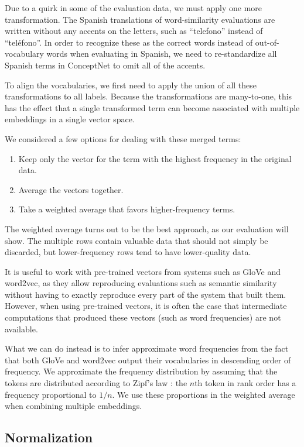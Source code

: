 \documentclass[11pt,letterpaper]{article}
\begin{document}
Due to a quirk in some of the evaluation data, we must apply one more
transformation. The Spanish translations of word-similarity evaluations
\cite{hassan2009crosslingual} are written without any accents on the letters,
such as ``telefono'' instead of ``tel\'{e}fono''. In order to recognize these as
the correct words instead of out-of-vocabulary words when evaluating in Spanish,
we need to re-standardize all Spanish terms in ConceptNet to omit all of the
accents.

To align the vocabularies, we first need to apply the union of all these
transformations to all labels. Because the transformations are many-to-one, this
has the effect that a single transformed term can become associated with
multiple embeddings in a single vector space.

We considered a few options for dealing with these merged terms:

\begin{enumerate}
\item Keep only the vector for the term with the highest frequency in the
    original data.
\item Average the vectors together.
\item Take a weighted average that favors higher-frequency terms.
\end{enumerate}

The weighted average turns out to be the best approach, as our evaluation will
show. The multiple rows contain valuable data that should not simply be
discarded, but lower-frequency rows tend to have lower-quality data.

It is useful to work with pre-trained vectors from systems such as GloVe and
word2vec, as they allow reproducing evaluations such as semantic similarity
without having to exactly reproduce every part of the system that built them.
However, when using pre-trained vectors, it is often the case that intermediate
computations that produced these vectors (such as word frequencies) are not
available.

What we can do instead is to infer approximate word frequencies from the fact
that both GloVe and word2vec output their vocabularies in descending order of
frequency. We approximate the frequency distribution by assuming that the tokens
are distributed according to Zipf's law \cite{zipf1949human}: the $n$th token in
rank order has a frequency proportional to $1/n$. We use these proportions in
the weighted average when combining multiple embeddings.


\subsection{Normalization}
\end{document}
